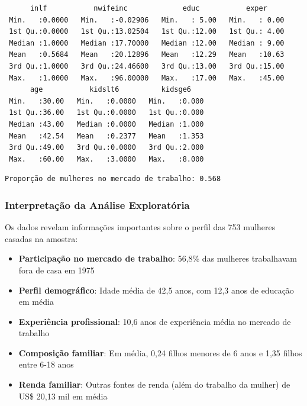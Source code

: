 \documentclass[
  letterpaper,
  DIV=11,
  numbers=noendperiod]{scrartcl}
\newenvironment{Shaded}{\begin{snugshade}}{\end{snugshade}}
\newcommand{\CommentTok}[1]{\textcolor[rgb]{0.37,0.37,0.37}{#1}}
\newcommand{\DecValTok}[1]{\textcolor[rgb]{0.68,0.00,0.00}{#1}}
\newcommand{\FunctionTok}[1]{\textcolor[rgb]{0.28,0.35,0.67}{#1}}
\newcommand{\NormalTok}[1]{\textcolor[rgb]{0.00,0.23,0.31}{#1}}
\newcommand{\OtherTok}[1]{\textcolor[rgb]{0.00,0.23,0.31}{#1}}
\newcommand{\SpecialCharTok}[1]{\textcolor[rgb]{0.37,0.37,0.37}{#1}}
\newcommand{\StringTok}[1]{\textcolor[rgb]{0.13,0.47,0.30}{#1}}
\providecommand{\tightlist}{%
  \setlength{\itemsep}{0pt}\setlength{\parskip}{0pt}}\usepackage{longtable,booktabs,array}
\begin{document}
\begin{verbatim}
      inlf           nwifeinc             educ           exper      
 Min.   :0.0000   Min.   :-0.02906   Min.   : 5.00   Min.   : 0.00  
 1st Qu.:0.0000   1st Qu.:13.02504   1st Qu.:12.00   1st Qu.: 4.00  
 Median :1.0000   Median :17.70000   Median :12.00   Median : 9.00  
 Mean   :0.5684   Mean   :20.12896   Mean   :12.29   Mean   :10.63  
 3rd Qu.:1.0000   3rd Qu.:24.46600   3rd Qu.:13.00   3rd Qu.:15.00  
 Max.   :1.0000   Max.   :96.00000   Max.   :17.00   Max.   :45.00  
      age           kidslt6          kidsge6     
 Min.   :30.00   Min.   :0.0000   Min.   :0.000  
 1st Qu.:36.00   1st Qu.:0.0000   1st Qu.:0.000  
 Median :43.00   Median :0.0000   Median :1.000  
 Mean   :42.54   Mean   :0.2377   Mean   :1.353  
 3rd Qu.:49.00   3rd Qu.:0.0000   3rd Qu.:2.000  
 Max.   :60.00   Max.   :3.0000   Max.   :8.000  
\end{verbatim}

\begin{Shaded}
\end{Shaded}

\begin{verbatim}
Proporção de mulheres no mercado de trabalho: 0.568
\end{verbatim}

\subsubsection{Interpretação da Análise
Exploratória}\label{interpretauxe7uxe3o-da-anuxe1lise-exploratuxf3ria}

Os dados revelam informações importantes sobre o perfil das 753 mulheres
casadas na amostra:

\begin{itemize}
\tightlist
\item
  \textbf{Participação no mercado de trabalho}: 56,8\% das mulheres
  trabalhavam fora de casa em 1975
\item
  \textbf{Perfil demográfico}: Idade média de 42,5 anos, com 12,3 anos
  de educação em média
\item
  \textbf{Experiência profissional}: 10,6 anos de experiência média no
  mercado de trabalho
\item
  \textbf{Composição familiar}: Em média, 0,24 filhos menores de 6 anos
  e 1,35 filhos entre 6-18 anos
\item
  \textbf{Renda familiar}: Outras fontes de renda (além do trabalho da
  mulher) de US\$ 20,13 mil em média
\end{itemize}
\end{document}
